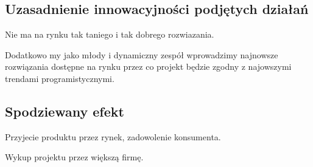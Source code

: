 \documentclass[12pt]{article}
\begin{document}
\subsection{Uzasadnienie innowacyjności podjętych działań }

Nie ma na rynku tak taniego i tak dobrego rozwiazania.

Dodatkowo my jako młody i dynamiczny zespół wprowadzimy najnowsze rozwiązania dostępne na rynku przez co projekt będzie zgodny z najowszymi trendami programistycznymi.

\subsection{Spodziewany efekt }


Przyjecie produktu przez rynek, zadowolenie konsumenta.
 
Wykup projektu przez większą firmę.
\end{document}
